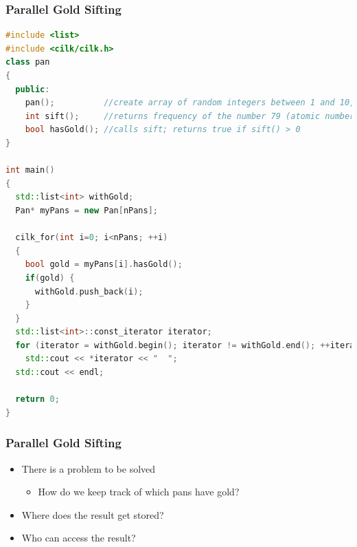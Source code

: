 \documentclass[fleqn,xcolor=table,10pt,final]{beamer}
\begin{document}
\begin{frame}[fragile]
  \frametitle{Parallel Gold Sifting}
  \begin{lstlisting}[language=C++,basicstyle=\scriptsize]
#include <list>
#include <cilk/cilk.h>
class pan
{
  public:
    pan();          //create array of random integers between 1 and 10,000
    int sift();     //returns frequency of the number 79 (atomic number of gold)
    bool hasGold(); //calls sift; returns true if sift() > 0
}

int main()
{
  std::list<int> withGold;
  Pan* myPans = new Pan[nPans];

  cilk_for(int i=0; i<nPans; ++i)
  {
    bool gold = myPans[i].hasGold();
    if(gold) {
      withGold.push_back(i);
    }
  }
  std::list<int>::const_iterator iterator;
  for (iterator = withGold.begin(); iterator != withGold.end(); ++iterator)
    std::cout << *iterator << "  ";
  std::cout << endl;

  return 0;
}
  \end{lstlisting}
\end{frame}

\begin{frame}
  \frametitle{Parallel Gold Sifting}
  \begin{itemize}
    \item There is a problem to be solved
      \begin{itemize}
        \item How do we keep track of which pans have gold?
      \end{itemize}
      \vskip 1.0cm
    \item Where does the result get stored?
    \item Who can access the result?
  \end{itemize}
\end{frame}
\end{document}
